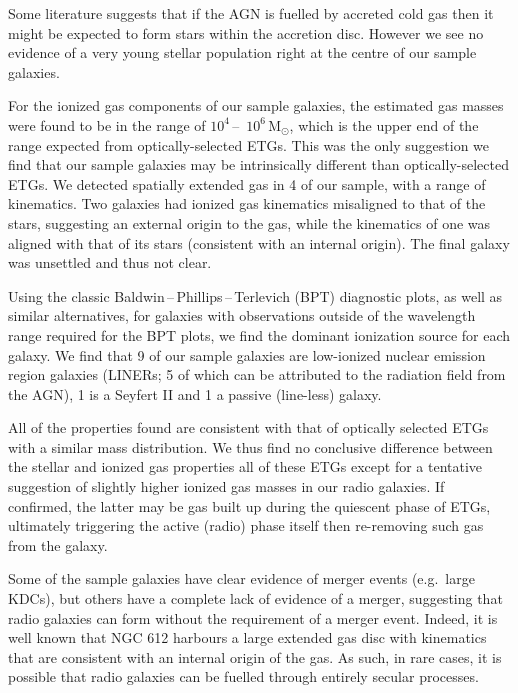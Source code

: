 \begin{abstractlong}
Some literature suggests that if the AGN is fuelled by accreted cold gas then it might be expected to form stars within the accretion disc. However we see no evidence of a very young stellar population right at the centre of our sample galaxies. 

For the ionized gas components of our sample galaxies, the estimated gas masses were found to be in the range of $10^4$\,--\, $10^6\,\mathrm{M_\odot}$, which is the upper end of the range expected from optically-selected ETGs. This was the only suggestion we find that our sample galaxies may be intrinsically different than optically-selected ETGs. We detected spatially extended gas in 4 of our sample, with a range of kinematics. Two galaxies had ionized gas kinematics misaligned to that of the stars, suggesting an external origin to the gas, while the kinematics of one was aligned with that of its stars (consistent with an internal origin). The final galaxy was unsettled and thus not clear. 

Using the classic Baldwin\,--\,Phillips\,--\,Terlevich (BPT) diagnostic plots, as well as similar alternatives, for galaxies with observations outside of the wavelength range required for the BPT plots, we find the dominant ionization source for each galaxy. We find that 9 of our sample galaxies are low-ionized nuclear emission region galaxies (LINERs; 5 of which can be attributed to the radiation field from the AGN), 1 is a Seyfert II and 1 a passive (line-less) galaxy. 

All of the properties found are consistent with that of optically selected ETGs with a similar mass distribution. We thus find no conclusive difference between the stellar and ionized gas properties all of these ETGs except for a tentative suggestion of slightly higher ionized gas masses in our radio galaxies. If confirmed, the latter may be gas built up during the quiescent phase of ETGs, ultimately triggering the active (radio) phase itself then re-removing such gas from the galaxy.

Some of the sample galaxies have clear evidence of merger events (e.g.\ large KDCs), but others have a complete lack of evidence of a merger, suggesting that radio galaxies can form without the requirement of a merger event. Indeed, it is well known that NGC 612 harbours a large extended gas disc with kinematics that are consistent with an internal origin of the gas. As such, in rare cases, it is possible that radio galaxies can be fuelled through entirely secular processes.
\end{abstractlong}